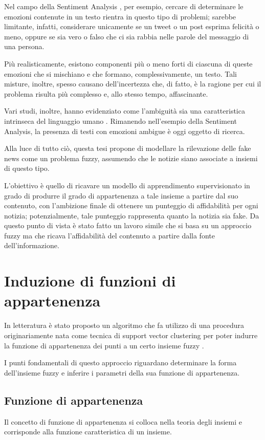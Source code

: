 \documentclass[12pt]{report}
\theoremstyle{definition}
\begin{document}
Nel campo della Sentiment Analysis \cite{25}, per esempio, cercare di determinare le emozioni contenute in un testo rientra in questo tipo di problemi; sarebbe limitante, infatti, considerare unicamente se un tweet o un post esprima felicità o meno, oppure se sia vero o falso che ci sia rabbia nelle parole del messaggio di una persona.

Più realisticamente, esistono componenti più o meno forti di ciascuna di queste emozioni che si mischiano e che formano, complessivamente, un testo.
Tali misture, inoltre, spesso causano dell'incertezza che, di fatto, è la ragione per cui il problema risulta più complesso e, allo stesso tempo, affascinante.

Vari studi, inoltre, hanno evidenziato come l'ambiguità sia una caratteristica intrinseca del linguaggio umano \cite{26, 27}.
Rimanendo nell'esempio della Sentiment Analysis, la presenza di testi con emozioni ambigue è oggi oggetto di ricerca.

Alla luce di tutto ciò, questa tesi propone di modellare la rilevazione delle fake news come un problema fuzzy, assumendo che le notizie siano associate a insiemi di questo tipo.

L'obiettivo è quello di ricavare un modello di apprendimento supervisionato in grado di produrre il grado di appartenenza a tale insieme a partire dal suo contenuto, con l'ambizione finale di ottenere un punteggio di affidabilità per ogni notizia;
potenzialmente, tale punteggio rappresenta quanto la notizia sia fake. Da questo punto di vista è stato fatto un lavoro simile \cite{35} che si basa su un approccio fuzzy ma che ricava l'affidabilità del contenuto a partire dalla fonte dell'informazione.

\section{Induzione di funzioni di appartenenza} \label{induzione}
In letteratura è stato proposto un algoritmo che fa utilizzo di una procedura originariamente nata come tecnica di support vector clustering per poter indurre la funzione di appartenenza dei punti a un certo insieme fuzzy \cite{1}.

I punti fondamentali di questo approccio riguardano determinare la forma dell'insieme fuzzy e inferire i parametri della sua funzione di appartenenza.

\subsection{Funzione di appartenenza} \label{membership}
Il concetto di funzione di appartenenza si colloca nella teoria degli insiemi e corrisponde alla funzione caratteristica di un insieme.
\end{document}
